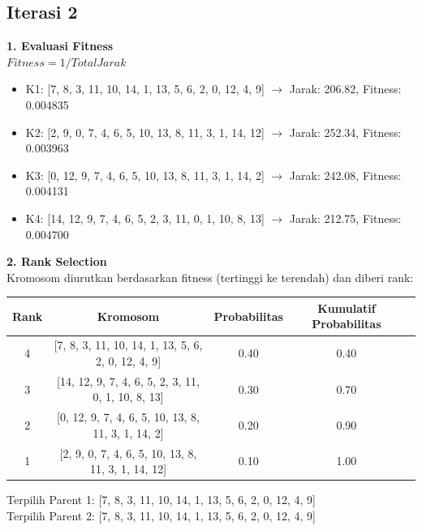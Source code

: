 \documentclass[12pt]{article}
\begin{document}
\subsection*{Iterasi 2}
\textbf{1. Evaluasi Fitness}\\$Fitness = 1 / Total Jarak$
\begin{itemize}
\item K1: [7, 8, 3, 11, 10, 14, 1, 13, 5, 6, 2, 0, 12, 4, 9] $\rightarrow$ Jarak: 206.82, Fitness: 0.004835
\item K2: [2, 9, 0, 7, 4, 6, 5, 10, 13, 8, 11, 3, 1, 14, 12] $\rightarrow$ Jarak: 252.34, Fitness: 0.003963
\item K3: [0, 12, 9, 7, 4, 6, 5, 10, 13, 8, 11, 3, 1, 14, 2] $\rightarrow$ Jarak: 242.08, Fitness: 0.004131
\item K4: [14, 12, 9, 7, 4, 6, 5, 2, 3, 11, 0, 1, 10, 8, 13] $\rightarrow$ Jarak: 212.75, Fitness: 0.004700
\end{itemize}
\vspace{0.5cm}\textbf{2. Rank Selection}\\Kromosom diurutkan berdasarkan fitness (tertinggi ke terendah) dan diberi rank:
\begin{table}[h!]\centering\begin{tabular}{ccccc}\toprule Rank & Kromosom & Probabilitas & Kumulatif Probabilitas \\ \midrule
4 & [7, 8, 3, 11, 10, 14, 1, 13, 5, 6, 2, 0, 12, 4, 9] & 0.40 & 0.40 \\
3 & [14, 12, 9, 7, 4, 6, 5, 2, 3, 11, 0, 1, 10, 8, 13] & 0.30 & 0.70 \\
2 & [0, 12, 9, 7, 4, 6, 5, 10, 13, 8, 11, 3, 1, 14, 2] & 0.20 & 0.90 \\
1 & [2, 9, 0, 7, 4, 6, 5, 10, 13, 8, 11, 3, 1, 14, 12] & 0.10 & 1.00 \\
\bottomrule\end{tabular}\end{table}
Terpilih Parent 1: [7, 8, 3, 11, 10, 14, 1, 13, 5, 6, 2, 0, 12, 4, 9]\\
Terpilih Parent 2: [7, 8, 3, 11, 10, 14, 1, 13, 5, 6, 2, 0, 12, 4, 9]\\
\end{document}
